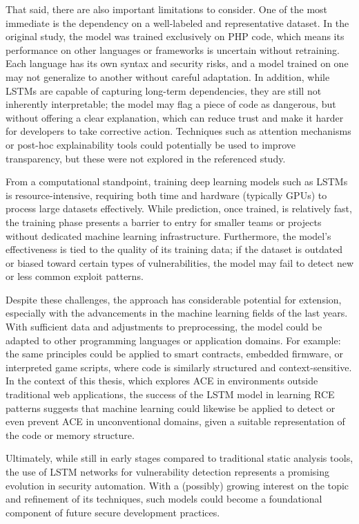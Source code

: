\documentclass[a4paper]{usiinfbachelorproject}
\begin{document}
That said, there are also important limitations to consider. One of the most immediate is the dependency on a well-labeled and representative dataset. In the original study, the model was trained exclusively on PHP code, which means its performance on other languages or frameworks is uncertain without retraining. Each language has its own syntax and security risks, and a model trained on one may not generalize to another without careful adaptation. In addition, while LSTMs are capable of capturing long-term dependencies, they are still not inherently interpretable; the model may flag a piece of code as dangerous, but without offering a clear explanation, which can reduce trust and make it harder for developers to take corrective action. Techniques such as attention mechanisms\cite{att_mec} or post-hoc explainability tools\cite{post_hox} could potentially be used to improve transparency, but these were not explored in the referenced study.

From a computational standpoint, training deep learning models such as LSTMs is resource-intensive\cite{stacked-lstm-cost}, requiring both time and hardware (typically GPUs) to process large datasets effectively. While prediction, once trained, is relatively fast, the training phase presents a barrier to entry for smaller teams or projects without dedicated machine learning infrastructure. Furthermore, the model’s effectiveness is tied to the quality of its training data; if the dataset is outdated or biased toward certain types of vulnerabilities, the model may fail to detect new or less common exploit patterns.

Despite these challenges, the approach has considerable potential for extension, especially with the advancements in the machine learning fields of the last years. With sufficient data and adjustments to preprocessing, the model could be adapted to other programming languages or application domains. For example: the same principles could be applied to smart contracts, embedded firmware, or interpreted game scripts, where code is similarly structured and context-sensitive. In the context of this thesis, which explores ACE in environments outside traditional web applications, the success of the LSTM model in learning RCE patterns suggests that machine learning could likewise be applied to detect or even prevent ACE in unconventional domains, given a suitable representation of the code or memory structure.

Ultimately, while still in early stages compared to traditional static analysis tools, the use of LSTM networks for vulnerability detection represents a promising evolution in security automation. With a (possibly) growing interest on the topic and refinement of its techniques, such models could become a foundational component of future secure development practices.
\end{document}
